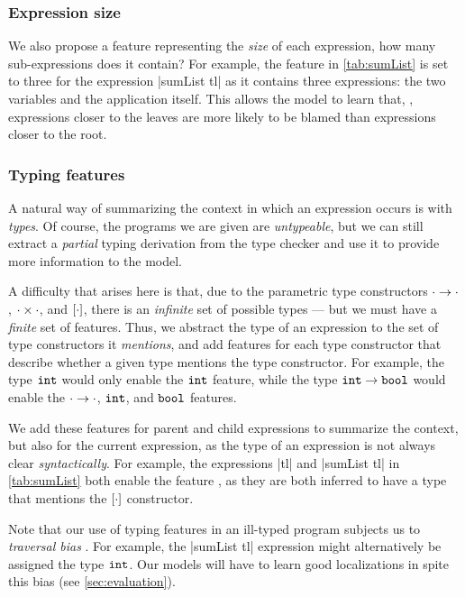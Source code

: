 \subsubsection{Expression size}
We also propose a feature representing the \emph{size} of each expression,
\ie how many sub-expressions does it contain?
%
For example, the \ExprSize feature in \autoref{tab:sumList} is set to three
for the expression |sumList tl| as it contains three expressions:
the two variables and the application itself.
%
This allows the model to learn that, \eg, expressions closer to the
leaves are more likely to be blamed than expressions closer to the root.

\subsubsection{Typing features}
A natural way of summarizing the context in which an expression occurs
is with \emph{types}.
%
Of course, the programs we are given are \emph{untypeable}, but we can
still extract a \emph{partial} typing derivation from the type checker
and use it to provide more information to the model.

A difficulty that arises here is that, due to the parametric type
constructors $\cdot \to \cdot$, $\cdot \times \cdot$, and
$[\cdot]$, there is an \emph{infinite} set of possible types ---
but we must have a \emph{finite} set of features.
%
Thus, we abstract the type of an expression to the set of type
constructors it \emph{mentions}, and add features for each type
constructor that describe whether a given type mentions the type
constructor.
%
For example, the type $\mathtt{int}$ would only enable the $\mathtt{int}$ feature,
while the type $\mathtt{int} \to \mathtt{bool}$ would enable the
$\cdot \to \cdot$, $\mathtt{int}$, and $\mathtt{bool}$ features.

We add these features for parent and child expressions to summarize the
context, but also for the current expression, as the type of an
expression is not always clear \emph{syntactically}.
%
For example, the expressions |tl| and |sumList tl|
in \autoref{tab:sumList} both enable the feature \HasTypeList, as they
are both inferred to have a type that mentions the $[\cdot]$
constructor.

Note that our use of typing features in an ill-typed program subjects us
to \emph{traversal bias} \citep{McAdam1998-ub}. For example, the
|sumList tl| expression might alternatively be assigned the type
$\mathtt{int}$.
%
Our models will have to learn good localizations in spite this bias (see
\autoref{sec:evaluation}).

